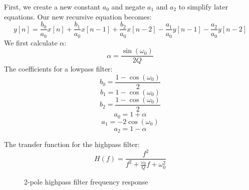 \documentclass[11pt,a4paper]{article}
\begin{document}
First, we create a new constant $a_0$ and negate $a_1$ and $a_2$ to simplify later equations. Our new recursive equation becomes:
\begin{equation}
y[n] = \frac{b_0}{a_0}x[n] + \frac{b_1}{a_0}x[n-1] + \frac{b_2}{a_0}x[n-2] - \frac{a_1}{a_0}y[n-1] - \frac{a_2}{a_0}y[n-2]
\end{equation}
We first calculate $\alpha$:
\begin{equation}
\alpha = \frac{\sin(\omega_0)}{2Q}
\end{equation}
The coefficients for a lowpass filter:
\begin{equation}
b_0 = \frac{1 - \cos(\omega_0)}{2}
\end{equation}
\begin{equation}
b_1 = 1 - \cos(\omega_0)
\end{equation}
\begin{equation}
b_2 = \frac{1 - \cos(\omega_0)}{2}
\end{equation}
\begin{equation}
a_0 = 1 + \alpha
\end{equation}
\begin{equation}
a_1 = -2\cos(\omega_0)
\end{equation}
\begin{equation}
a_2 = 1 - \alpha
\end{equation}

The transfer function for the highpass filter:
\begin{equation}
H(f) = \frac{f^2}{f^2 + \frac{\omega_0}{Q}f + \omega_0^2}
\end{equation}


\begin{figure}[ht]
\caption{2-pole highpass filter frequency response}
\centering
{}

\end{figure}
\end{document}
